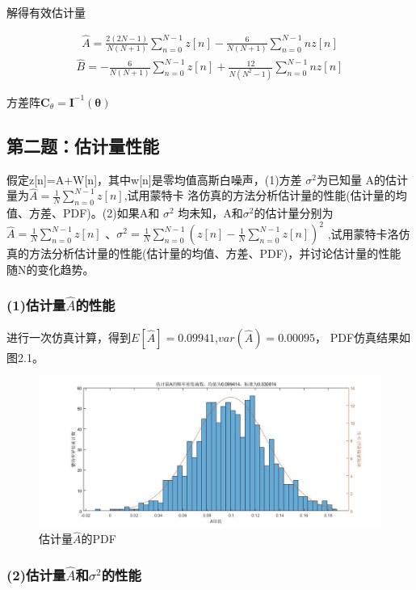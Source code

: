 \documentclass[fontset=windows]{article}
\numberwithin{figure}{section}
\begin{document}
解得有效估计量

\begin{align*}
	\hat{A}=\frac{2(2N-1)}{N(N+1)}\sum_{n=0}^{N-1}z[n]-\frac{6}{N(N+1)}\sum_{n=0}^{N-1}nz[n]
\end{align*}
\begin{align*}
	\hat{B}=-\frac{6}{N(N+1)}\sum_{n=0}^{N-1}z[n]+\frac{12}{N(N^2-1)}\sum_{n=0}^{N-1}nz[n]
\end{align*}

方差阵\(\mathbf{C}_{\theta}=\mathbf{I}^{-1}(\boldsymbol{\theta})\)

\subsection{第二题：估计量性能}
假定z[n]=A+W[n]，其中w[n]是零均值高斯白噪声，(1)方差 \(\sigma^2\)为已知量
A的估计量为\(\hat{A}=\frac{1}{N}\sum_{n = 0}^{N-1}z[n] \),试用蒙特卡
洛仿真的方法分析估计量的性能(估计量的均值、方差、PDF)。(2)如果A和 \(\sigma^2\)
均未知，A和\(\sigma^2\)的估计量分别为\(\hat{A}=\frac{1}{N}\sum_{n=0}^{N-1}z[n]\)
、\(\sigma^2=\frac{1}{N}\sum_{n=0}^{N-1}(z[n]-\frac{1}{N}\sum_{n=0}^{N-1}z[n])^2\)
,试用蒙特卡洛仿真的方法分析估计量的性能(估计量的均值、方差、PDF)，并讨论估计量的性能
随N的变化趋势。

\subsubsection*{(1)估计量\(\hat{A}\)的性能}

进行一次仿真计算，得到\(E[\hat{A}]=0.09941\),\(var(\hat{A})=0.00095\)，
PDF仿真结果如图2.1。
\begin{figure}[H]
	\centering
	\includegraphics[scale=0.4]{fig2.1.jpg}
	\caption{估计量\(\hat{A}\)的PDF}
	\label{1.2.1}
\end{figure}

\subsubsection*{(2)估计量\(\hat{A}\)和\(\sigma^2\)的性能}
\end{document}
